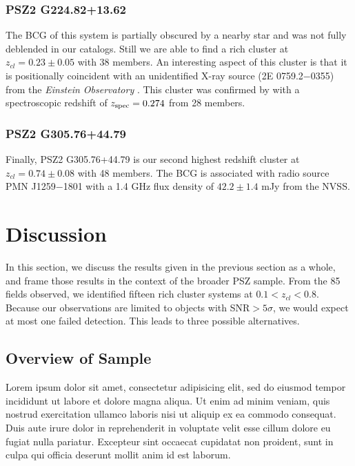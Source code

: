 \documentclass[apj, revtex4-1]{emulateapj}
\begin{document}
\subsubsection{PSZ2 G224.82+13.62}  %
The BCG of this system is partially obscured by a nearby star and was not fully deblended in our catalogs.  Still we are able to find a rich cluster at $z_{cl} = 0.23 \pm 0.05$ with 38 members.  An interesting aspect of this cluster is that it is positionally coincident with an unidentified X-ray source (2E 0759.2$-$0355) from the {\it Einstein Observatory} \citep{Harris1990}. This cluster was confirmed by \cite{Barrena2018} with a spectroscopic redshift of $z_{\rm spec} = 0.274$ from 28 members.

\subsubsection{PSZ2 G305.76+44.79}  %
Finally, PSZ2 G305.76+44.79 is our second highest redshift cluster at $z_{cl} = 0.74 \pm 0.08$ with 48 members. The BCG is associated with radio source PMN J1259$-$1801 with a 1.4 GHz flux density of $42.2\pm 1.4$ mJy from the NVSS.


\section{Discussion}\label{sec:discussion}
In this section, we discuss the results given in the previous section as a whole, and frame those results in the context of the broader PSZ sample. From the 85 fields observed, we identified fifteen rich cluster systems at $0.1 < z_{cl} < 0.8$. Because our observations are limited to objects with SNR$>5\sigma$, we would expect at most one failed detection. This leads to three possible alternatives.

\subsection{Overview of Sample}
Lorem ipsum dolor sit amet, consectetur adipisicing elit, sed do eiusmod tempor incididunt ut labore et dolore magna aliqua. Ut enim ad minim veniam, quis nostrud exercitation ullamco laboris nisi ut aliquip ex ea commodo consequat. Duis aute irure dolor in reprehenderit in voluptate velit esse cillum dolore eu fugiat nulla pariatur. Excepteur sint occaecat cupidatat non proident, sunt in culpa qui officia deserunt mollit anim id est laborum.
\end{document}
